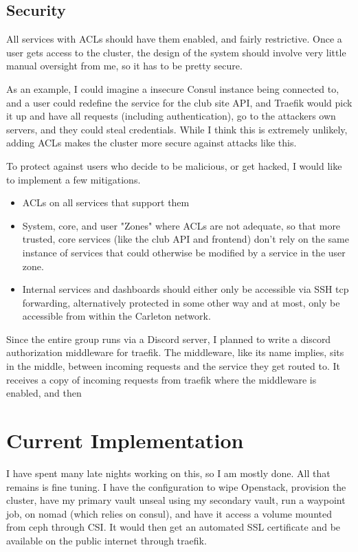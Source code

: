 \documentclass{article}
\begin{document}
\subsection{Security}
All services with ACLs should have them enabled, and fairly restrictive. Once a user gets access to the cluster, the design of the system should involve very little manual oversight from me, so it has to be pretty secure.

As an example, I could imagine a insecure Consul instance being connected to, and a user could redefine the service for the club site API, and Traefik would pick it up and have all requests (including authentication), go to the attackers own servers, and they could steal credentials. While I think this is extremely unlikely, adding ACLs makes the cluster more secure against attacks like this.

To protect against users who decide to be malicious, or get hacked, I would like to implement a few mitigations.
\begin{itemize}
    \item ACLs on all services that support them
    \item System, core, and user "Zones" where ACLs are not adequate, so that more trusted, core services (like the club API and frontend) don't rely on the same instance of services that could otherwise be modified by a service in the user zone.
    \item Internal services and dashboards should either only be accessible via SSH tcp forwarding, alternatively protected in some other way and at most, only be accessible from within the Carleton network.
\end{itemize}
Since the entire group runs via a Discord server, I planned to write a discord authorization middleware for traefik. The middleware, like its name implies, sits in the middle, between incoming requests and the service they get routed to. It receives a copy of incoming requests from traefik where the middleware is enabled, and then 


\section{Current Implementation}
I have spent many late nights working on this, so I am mostly done. All that remains is fine tuning. I have the configuration to wipe Openstack, provision the cluster, have my primary vault unseal using my secondary vault, run a waypoint job, on nomad (which relies on consul), and have it access a volume mounted from ceph through CSI. It would then get an automated SSL certificate and be available on the public internet through traefik.
\end{document}
